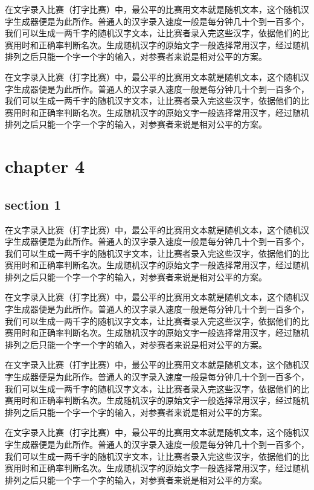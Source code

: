 \documentclass[12pt,hyperref,UTF8]{ctexbook}
\begin{document}
在文字录入比赛（打字比赛）中，最公平的比赛用文本就是随机文本，这个随机汉字生成器便是为此所作。普通人的汉字录入速度一般是每分钟几十个到一百多个，我们可以生成一两千字的随机汉字文本，让比赛者录入完这些汉字，依据他们的比赛用时和正确率判断名次。生成随机汉字的原始文字一般选择常用汉字，经过随机排列之后只能一个字一个字的输入，对参赛者来说是相对公平的方案。

在文字录入比赛（打字比赛）中，最公平的比赛用文本就是随机文本，这个随机汉字生成器便是为此所作。普通人的汉字录入速度一般是每分钟几十个到一百多个，我们可以生成一两千字的随机汉字文本，让比赛者录入完这些汉字，依据他们的比赛用时和正确率判断名次。生成随机汉字的原始文字一般选择常用汉字，经过随机排列之后只能一个字一个字的输入，对参赛者来说是相对公平的方案。

\cleardoublepage
\chapter{chapter 4}

\section{section 1}

在文字录入比赛（打字比赛）中，最公平的比赛用文本就是随机文本，这个随机汉字生成器便是为此所作。普通人的汉字录入速度一般是每分钟几十个到一百多个，我们可以生成一两千字的随机汉字文本，让比赛者录入完这些汉字，依据他们的比赛用时和正确率判断名次。生成随机汉字的原始文字一般选择常用汉字，经过随机排列之后只能一个字一个字的输入，对参赛者来说是相对公平的方案。

在文字录入比赛（打字比赛）中，最公平的比赛用文本就是随机文本，这个随机汉字生成器便是为此所作。普通人的汉字录入速度一般是每分钟几十个到一百多个，我们可以生成一两千字的随机汉字文本，让比赛者录入完这些汉字，依据他们的比赛用时和正确率判断名次。生成随机汉字的原始文字一般选择常用汉字，经过随机排列之后只能一个字一个字的输入，对参赛者来说是相对公平的方案。

在文字录入比赛（打字比赛）中，最公平的比赛用文本就是随机文本，这个随机汉字生成器便是为此所作。普通人的汉字录入速度一般是每分钟几十个到一百多个，我们可以生成一两千字的随机汉字文本，让比赛者录入完这些汉字，依据他们的比赛用时和正确率判断名次。生成随机汉字的原始文字一般选择常用汉字，经过随机排列之后只能一个字一个字的输入，对参赛者来说是相对公平的方案。

在文字录入比赛（打字比赛）中，最公平的比赛用文本就是随机文本，这个随机汉字生成器便是为此所作。普通人的汉字录入速度一般是每分钟几十个到一百多个，我们可以生成一两千字的随机汉字文本，让比赛者录入完这些汉字，依据他们的比赛用时和正确率判断名次。生成随机汉字的原始文字一般选择常用汉字，经过随机排列之后只能一个字一个字的输入，对参赛者来说是相对公平的方案。
\end{document}
